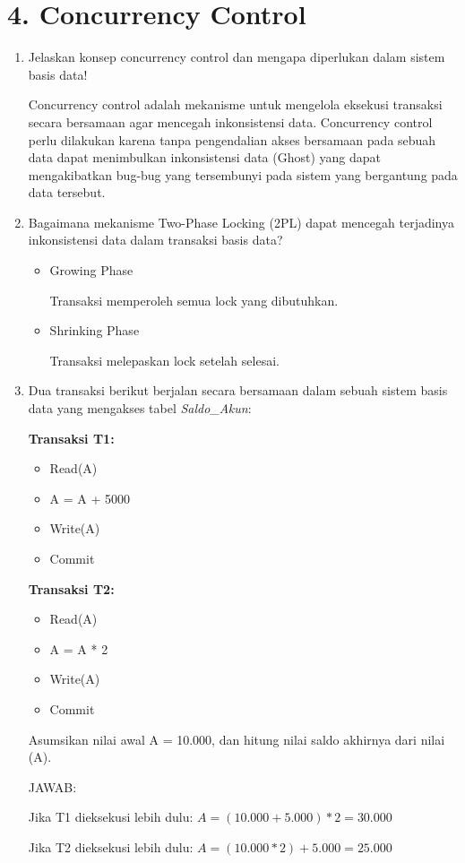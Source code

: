\documentclass[a4paper,11pt]{article}
\begin{document}
\section*{4. Concurrency Control}
\begin{enumerate}[label=\alph*.]
    \item Jelaskan konsep concurrency control dan mengapa diperlukan dalam sistem basis data!

     Concurrency control adalah mekanisme untuk mengelola eksekusi transaksi
     secara bersamaan agar mencegah inkonsistensi data. Concurrency control
     perlu dilakukan karena tanpa pengendalian akses bersamaan pada sebuah data
     dapat menimbulkan inkonsistensi data (Ghost) yang dapat mengakibatkan
     bug-bug yang tersembunyi pada sistem yang bergantung pada data tersebut.

    \item Bagaimana mekanisme Two-Phase Locking (2PL) dapat mencegah terjadinya inkonsistensi data dalam transaksi basis data?

    \begin{itemize}
        \item Growing Phase

          Transaksi memperoleh semua lock yang dibutuhkan.

        \item Shrinking Phase

          Transaksi melepaskan lock setelah selesai.

    \end{itemize}


    \item Dua transaksi berikut berjalan secara bersamaan dalam sebuah sistem basis data yang mengakses tabel \textit{Saldo\_Akun}:
    
    \textbf{Transaksi T1:}
    \begin{itemize}
        \item Read(A)
        \item A = A + 5000
        \item Write(A)
        \item Commit
    \end{itemize}

    
    \textbf{Transaksi T2:}
    \begin{itemize}
        \item Read(A)
        \item A = A * 2
        \item Write(A)
        \item Commit
    \end{itemize}

    Asumsikan nilai awal A = 10.000, dan hitung nilai saldo akhirnya dari nilai (A).

    JAWAB:

    Jika T1 dieksekusi lebih dulu: \( A = (10.000 + 5.000) * 2 = 30.000 \)

    Jika T2 dieksekusi lebih dulu: \( A = (10.000 * 2) + 5.000 = 25.000 \)

\end{enumerate}
\end{document}
